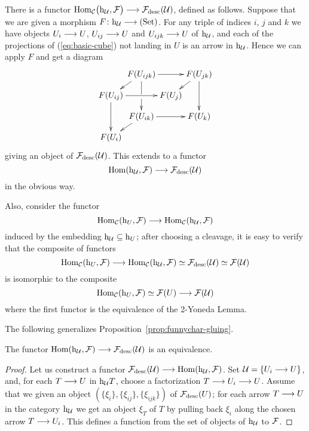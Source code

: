 \begin{4   STACKS}
\begin{4.1 Descent of objects of fibcats}
There is a functor $\hom_\cC\bigl(\h_{\cU}, \cF\bigr) \arr \cF\desc(\cU)$, defined as follows. Suppose that we are given a morphism $F \colon \h_{\cU} \arr \catset$. For any triple of indices $i$, $j$ and $k$ we have objects $U_i \arr U$, $U_{ij} \arr U$ and $U_{ijk} \arr U$ of $\mathrm{h}_{\mathcal{U}}$, and each of the projections of (\ref{eq:basic-cube}) not landing in $U$ is an arrow in $\mathrm{h}_{\mathcal{U}}$. Hence we can apply $F$ and get a diagram
   \[
   \xymatrix@R-15pt@C-25pt{
   &F(U_{ijk})\ar[rr]\ar'[d][dd]
   \ar[ld]
   &&F(U_{jk})\ar[ld]\ar[dd]\\
   F(U_{ij})\ar[dd]\ar[rr]
   && F(U_j)\\
   &F(U_{ik}) \ar[ld]\ar[rr]
   &&F(U_k)\\
   F(U_i)&&
   }
   \]
giving an object of $\mathcal{F}_{\mathrm{desc}} (\mathcal{U})$. This extends to a functor
   \[
   \hom(\h_{\cU}, \cF) \arr \cF\desc(\cU)
   \]
in the obvious way.

Also, consider the functor 
   \[
   \hom_\cC(\h_{U},\cF)
   \arr
  \hom_\cC(\h_{\cU},\cF)
   \]
 induced by the embedding $\mathrm{h}_{\mathcal{U}} \subseteq \mathrm{h}_{U}$; after choosing a cleavage, it is easy to verify that the composite of functors
   \[
   \hom_\cC(\h_{U},\cF)
   \arr
   \hom_\cC (\h_{\cU},\cF)
   \simeq
   \cF\desc(\cU)
   \simeq \cF(\cU)
   \]
is isomorphic to the composite
   \[
   \hom_\cC(\h_{U},\cF)
   \simeq
   \cF(U)
   \arr
   \cF(\cU)
   \]
where the first functor is the equivalence of the 2-Yoneda Lemma.

The following generalizes Proposition~\ref{prop:funnychar-gluing}.

\begin{proposition}\label{prop:funnychar-descent-data}
The functor $\hom(\h_{\cU}, \cF) \arr \cF\desc(\cU)$ is an equivalence.
\end{proposition}

\begin{proof}
Let us construct a functor $\cF\desc(\cU) \arr \hom(\h_{\cU}, \cF)$. Set $\mathcal{U} = \{U_{i} \longrightarrow U\}$, and, for each $T \arr U$ in $\mathrm{h}_{\mathcal{U}}T$, choose a factorization $T \arr U_{i} \arr U$. Assume that we given an object $(\{\xi_i\}, \{\xi_{ij}\},\{\xi_{ijk}\})$ of $\mathcal{F}_{\mathrm{desc}}(U)$; for each arrow $T \arr U$ in the category $\mathrm{h}_{\mathcal{U}}$ we get an object $\xi_{T}$ of $T$ by pulling back $\xi_{i}$ along the chosen arrow $T \arr U_{i}$. This defines a function from the set of objects of $\mathrm{h}_{\mathcal{U}}$ to $\mathcal{F}$. 


\end{proof}
\end{4.1 Descent of objects of fibcats}
\end{4   STACKS}
